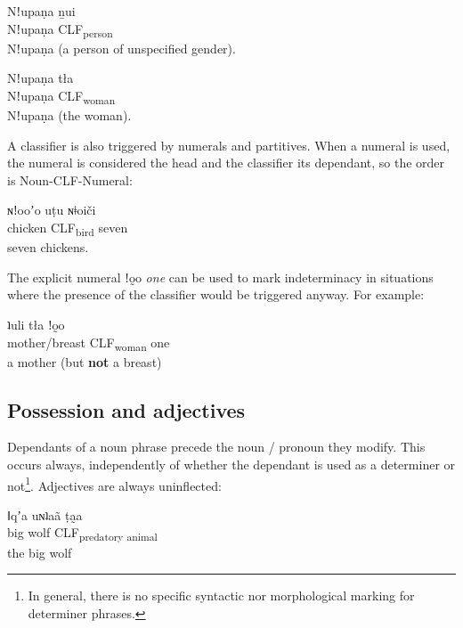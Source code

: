 \documentclass[11pt,a5paper]{book}
\newcommand{\qcn}[1]{\textcolor{AccentText}{\large#1}}
\newcommand{\transl}[2]{\qcn{#1} \emph{#2}}
\newcommand{\grammsc}[1]{\textsc{#1}}
\newcommand{\CLF}[1]{\grammsc{CLF}\textsubscript{#1}}
\begin{document}
\begin{exe}
\ex
\gll Nǃupaṇa ṉui\\
Nǃupaṇa 	\CLF{person}\\
\glt  Nǃupaṇa (a person of unspecified gender).
\end{exe}

\begin{exe}
\ex
\gll Nǃupaṇa 	tła\\
Nǃupaṇa 	\CLF{woman}\\
\glt Nǃupaṇa (the woman).
\end{exe}

A classifier is also triggered by numerals and partitives. When a numeral is used, the numeral is considered the head and the classifier its dependant, so the order is Noun-CLF-Numeral:

\begin{exe}
\ex
\gll ɴǃooʼo uṭu ɴǂoiči\\
chicken \CLF{bird} seven\\
\glt seven chickens.
\end{exe}

The explicit numeral \transl{ǃo̰o}{one} can be used to mark indeterminacy in situations where the presence of the classifier would be triggered anyway. For example:

\begin{exe}
\ex
\gll ʇuli tła ǃo̰o\\
mother/breast \CLF{woman} one\\
\glt a mother (but \textbf{not} a breast)
\end{exe}





\subsection{Possession and adjectives}

Dependants of a noun phrase precede the noun / pronoun they modify. This occurs always, independently of whether the dependant is used as a determiner or not\footnote{In general, there is no specific syntactic nor morphological marking for determiner phrases.}. Adjectives are always uninflected:

\begin{exe}
\ex
\gll ǁqʼa uɴʇaã ṭa̰a\\
big wolf \CLF{predatory animal}\\
\glt the big wolf
\end{exe}
\end{document}
